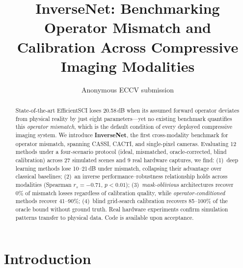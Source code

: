 \documentclass[runningheads]{llncs}
\begin{document}
\title{InverseNet: Benchmarking Operator Mismatch and Calibration Across Compressive Imaging Modalities}

\author{Anonymous ECCV submission}

\maketitle

\begin{abstract}
State-of-the-art EfficientSCI loses 20.58\,dB when its assumed forward operator deviates from physical reality by just eight parameters---yet no existing benchmark quantifies this \emph{operator mismatch}, which is the default condition of every deployed compressive imaging system.
We introduce \textbf{InverseNet}, the first cross-modality benchmark for operator mismatch, spanning CASSI, CACTI, and single-pixel cameras.
Evaluating 12 methods under a four-scenario protocol (ideal, mismatched, oracle-corrected, blind calibration) across 27 simulated scenes and 9 real hardware captures, we find: (1)~deep learning methods lose 10--21\,dB under mismatch, collapsing their advantage over classical baselines; (2)~an inverse performance--robustness relationship holds across modalities (Spearman $r_s{=}{-}0.71$, $p{<}0.01$); (3)~\emph{mask-oblivious} architectures recover 0\% of mismatch losses regardless of calibration quality, while \emph{operator-conditioned} methods recover 41--90\%; (4)~blind grid-search calibration recovers 85--100\% of the oracle bound without ground truth.
Real hardware experiments confirm simulation patterns transfer to physical data.
Code is available upon acceptance.

\end{abstract}

\section{Introduction}
\label{sec:intro}
\end{document}
